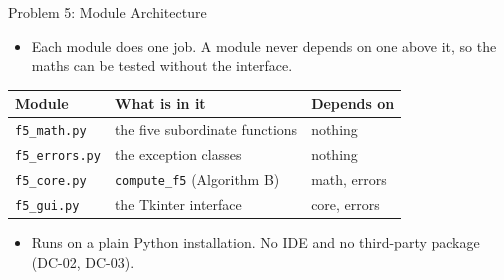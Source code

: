 \documentclass[11pt]{beamer}
\begin{document}
\begin{frame}{Problem 5: Module Architecture}
  \begin{itemize}
    \item Each module does one job. A module never depends on one above it,
          so the maths can be tested without the interface.
  \end{itemize}
  \medskip
  \centering
  \begin{tabular}{lll}
    \toprule
    Module & What is in it & Depends on \\
    \midrule
    \texttt{f5\_math.py}   & the five subordinate functions      & nothing \\
    \texttt{f5\_errors.py} & the exception classes               & nothing \\
    \texttt{f5\_core.py}   & \texttt{compute\_f5} (Algorithm B)  & math, errors \\
    \texttt{f5\_gui.py}    & the Tkinter interface               & core, errors \\
    \bottomrule
  \end{tabular}
  \medskip
  \begin{itemize}
    \item Runs on a plain Python installation. No IDE and no third-party
          package (DC-02, DC-03).
  \end{itemize}
\end{frame}
\end{document}

